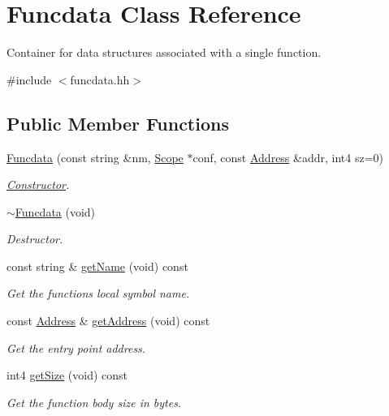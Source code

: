 \hypertarget{class_funcdata}{}\section{Funcdata Class Reference}
\label{class_funcdata}


Container for data structures associated with a single function.  




{\ttfamily \#include $<$funcdata.\+hh$>$}

\subsection*{Public Member Functions}
\begin{DoxyCompactItemize}
\item 
\mbox{\hyperlink{class_funcdata_aacdd409dd207aaa412afc5726bc86f6d}{Funcdata}} (const string \&nm, \mbox{\hyperlink{class_scope}{Scope}} $\ast$conf, const \mbox{\hyperlink{class_address}{Address}} \&addr, int4 sz=0)
\begin{DoxyCompactList}\small\item\em \mbox{\hyperlink{class_constructor}{Constructor}}. \end{DoxyCompactList}\item 
\mbox{\hyperlink{class_funcdata_a0b4fb40eeb52f948ca7a14187a21c7db}{$\sim$\+Funcdata}} (void)
\begin{DoxyCompactList}\small\item\em Destructor. \end{DoxyCompactList}\item 
const string \& \mbox{\hyperlink{class_funcdata_a8c6ed264ff7e018a4948045186e4af1f}{get\+Name}} (void) const
\begin{DoxyCompactList}\small\item\em Get the function\textquotesingle{}s local symbol name. \end{DoxyCompactList}\item 
const \mbox{\hyperlink{class_address}{Address}} \& \mbox{\hyperlink{class_funcdata_ae3357db0b73196679a798903f28cd798}{get\+Address}} (void) const
\begin{DoxyCompactList}\small\item\em Get the entry point address. \end{DoxyCompactList}\item 
int4 \mbox{\hyperlink{class_funcdata_a14a1dc8e5675b2d47d085f89c0b97df8}{get\+Size}} (void) const
\begin{DoxyCompactList}\small\item\em Get the function body size in bytes. \end{DoxyCompactList}\item 

\end{DoxyCompactItemize}
